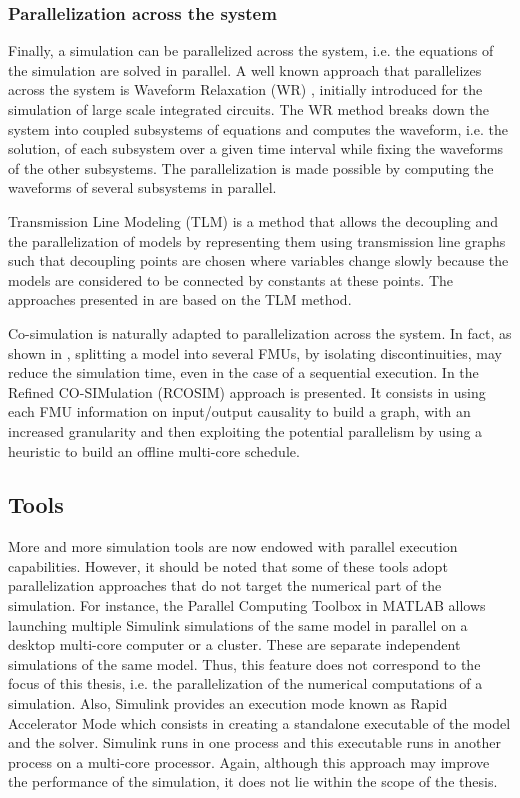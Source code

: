 \subsubsection{Parallelization across the system}

Finally, a simulation can be parallelized across the system, i.e. the equations of the simulation are solved in parallel. A well known approach that parallelizes across the system is Waveform Relaxation (WR) \cite{lelarasmee:1982}, initially introduced for the simulation of large scale integrated circuits. The WR method breaks down the system into coupled subsystems of equations and computes the waveform, i.e. the solution, of each subsystem over a given time interval while fixing the waveforms of the other subsystems. The parallelization is made possible by computing the waveforms of several subsystems in parallel. 

Transmission Line Modeling (TLM) \cite{hui:1990} is a method that allows the decoupling and the parallelization of models by representing them using transmission line graphs such that decoupling points are chosen where variables change slowly because the models are considered to be connected by constants at these points. The approaches presented in \cite{sjolund:2010,braun:2012} are based on the TLM method. 

Co-simulation is naturally adapted to parallelization across the system. In fact, as shown in \cite{Benkhaled_A_2012_ECOSM}, splitting a model into several FMUs, by isolating discontinuities, may reduce the simulation time, even in the case of a sequential execution. In \cite{benkhaled:2014} the Refined CO-SIMulation (RCOSIM) approach is presented. It consists in using each FMU information on input/output causality to build a graph, with an increased granularity and then exploiting the potential parallelism by using a heuristic to build an offline multi-core schedule.

\subsection{Tools}

More and more simulation tools are now endowed with parallel execution capabilities. However, it should be noted that some of these tools adopt parallelization approaches that do not target the numerical part of the simulation. For instance, the Parallel Computing Toolbox in MATLAB allows launching multiple Simulink simulations of the same model in parallel on a desktop multi-core computer or a cluster. These are separate independent simulations of the same model. Thus, this feature does not correspond to the focus of this thesis, i.e. the parallelization of the numerical computations of a simulation. Also, Simulink provides an execution mode known as Rapid Accelerator Mode which consists in creating a standalone executable of the model and the solver. Simulink runs in one process and this executable runs in another process on a multi-core processor. Again, although this approach may improve the performance of the simulation, it does not lie within the scope of the thesis.

